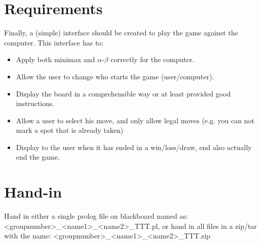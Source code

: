 \documentclass{article}
\begin{document}
\section{Requirements}
Finally, a (simple) interface should be created to play the game against the computer. This interface has to:
\begin{itemize}
    \item Apply both minimax and $\alpha$-$\beta$ correctly for the computer.
    \item Allow the user to change who starts the game (user/computer).
    \item Display the board in a comprehensible way or at least provided good instructions.
    \item Allow a user to select his move, and only allow legal moves (e.g. you can not mark a spot that is already taken)
    \item Display to the user when it has ended in a win/loss/draw, end also actually end the game.
\end{itemize}

\section{Hand-in}
Hand in either a single prolog file on blackboard named as: \textless groupnumber\textgreater\_\textless name1\textgreater\_\textless name2\textgreater\_TTT.pl, or hand in all files in a zip/tar with the name: \textless groupnumber\textgreater\_\textless name1\textgreater\_\textless name2\textgreater\_TTT.zip


\end{document}
